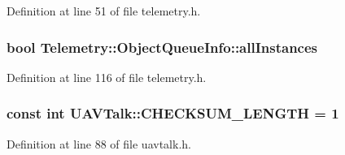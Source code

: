 \-Definition at line 51 of file telemetry.\-h.

\hypertarget{group___u_a_v_talk_plugin_gaf8816b148dce6b50838c9e84272a1d04}{
\subsubsection[{all\-Instances}]{\setlength{\rightskip}{0pt plus 5cm}bool \-Telemetry\-::\-Object\-Queue\-Info\-::all\-Instances}}\label{group___u_a_v_talk_plugin_gaf8816b148dce6b50838c9e84272a1d04}


\-Definition at line 116 of file telemetry.\-h.

\hypertarget{group___u_a_v_talk_plugin_ga094abac2d747f187a4b22bea1dd28ec0}{
\subsubsection[{\-C\-H\-E\-C\-K\-S\-U\-M\-\_\-\-L\-E\-N\-G\-T\-H}]{\setlength{\rightskip}{0pt plus 5cm}const int {\bf \-U\-A\-V\-Talk\-::\-C\-H\-E\-C\-K\-S\-U\-M\-\_\-\-L\-E\-N\-G\-T\-H} = 1}}\label{group___u_a_v_talk_plugin_ga094abac2d747f187a4b22bea1dd28ec0}


\-Definition at line 88 of file uavtalk.\-h.

